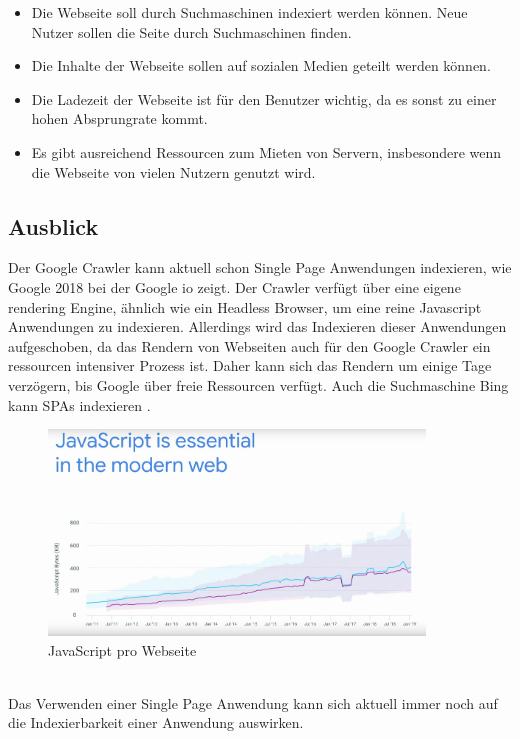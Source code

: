 \documentclass[runningheads]{llncs}
\begin{document}
\begin{itemize}
  \setlength\itemsep{1em}
  \item Die Webseite soll durch Suchmaschinen indexiert werden können. 
    Neue Nutzer sollen die Seite durch Suchmaschinen finden.
  \item Die Inhalte der Webseite sollen auf sozialen Medien geteilt werden können. 
  \item Die Ladezeit der Webseite ist für den Benutzer wichtig, 
  da es sonst zu einer hohen Absprungrate kommt.
  \item Es gibt ausreichend Ressourcen zum Mieten von Servern, 
  insbesondere wenn die Webseite von vielen Nutzern genutzt wird. 
\end{itemize}

\subsection{Ausblick}
\label{subsec:Ausblick}
Der Google Crawler kann aktuell schon Single Page Anwendungen indexieren, 
wie Google 2018 bei der Google io zeigt. 
Der Crawler verfügt über eine eigene rendering Engine, 
ähnlich wie ein Headless Browser, 
um eine reine Javascript Anwendungen zu indexieren. 
Allerdings wird das Indexieren dieser Anwendungen aufgeschoben, 
da das Rendern von Webseiten auch für den Google Crawler 
ein ressourcen intensiver Prozess ist. 
Daher kann sich das Rendern um einige Tage verzögern, 
bis Google über freie Ressourcen verfügt. 
Auch die Suchmaschine Bing kann SPAs indexieren\cite{GoogleSearchAndJS} \cite{SearchFriendly}.
\begin{figure}
  \centering
  \includegraphics[width=10cm]{images/JavaScriptGoogleShips}
  \caption{JavaScript pro Webseite \cite{SearchFriendly}}
  \label{JavaScript pro Website}
\end{figure}
\\
Das Verwenden einer Single Page Anwendung 
kann sich aktuell immer noch auf die Indexierbarkeit einer Anwendung auswirken. 
\end{document}
